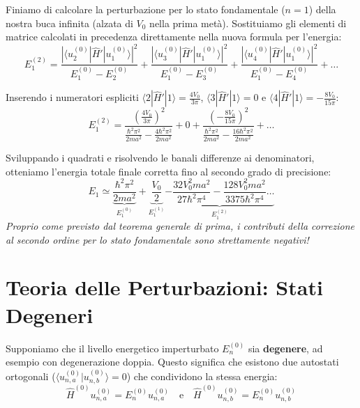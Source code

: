 \documentclass[11pt, a4paper]{article}
\begin{document}
Finiamo di calcolare la perturbazione per lo stato fondamentale ($n=1$) della nostra buca infinita (alzata di $V_0$ nella prima metà). Sostituiamo gli elementi di matrice calcolati in precedenza direttamente nella nuova formula per l'energia: %
\begin{equation*}
    E_1^{(2)} = \frac{|\langle u_2^{(0)} | \hat{H}' | u_1^{(0)} \rangle|^2}{E_1^{(0)} - E_2^{(0)}} + \frac{|\langle u_3^{(0)} | \hat{H}' | u_1^{(0)} \rangle|^2}{E_1^{(0)} - E_3^{(0)}} + \frac{|\langle u_4^{(0)} | \hat{H}' | u_1^{(0)} \rangle|^2}{E_1^{(0)} - E_4^{(0)}} + \dots %
\end{equation*}

\noindent
Inserendo i numeratori espliciti $\langle 2|\hat{H}'|1 \rangle = \frac{4V_0}{3\pi}$, $\langle 3|\hat{H}'|1 \rangle = 0$ e $\langle 4|\hat{H}'|1 \rangle = -\frac{8V_0}{15\pi}$: %
\begin{equation*}
    E_1^{(2)} = \frac{ \left( \frac{4V_0}{3\pi} \right)^2 }{ \frac{\hbar^2\pi^2}{2ma^2} - \frac{4\hbar^2\pi^2}{2ma^2} } + 0 + \frac{ \left( -\frac{8V_0}{15\pi} \right)^2 }{ \frac{\hbar^2\pi^2}{2ma^2} - \frac{16\hbar^2\pi^2}{2ma^2} } + \dots %
\end{equation*}

\noindent
Sviluppando i quadrati e risolvendo le banali differenze ai denominatori, otteniamo l'energia totale finale corretta fino al secondo grado di precisione: %
\begin{equation}
    \boxed{ E_1 \simeq \underbrace{ \frac{\hbar^2 \pi^2}{2ma^2} }_{E_1^{(0)}} + \underbrace{ \frac{V_0}{2} }_{E_1^{(1)}} \underbrace{ - \frac{32 V_0^2 m a^2}{27 \hbar^2 \pi^4} - \frac{128 V_0^2 m a^2}{3375 \hbar^2 \pi^4} \dots }_{E_1^{(2)}} } %
\end{equation}
\textit{Proprio come previsto dal teorema generale di prima, i contributi della correzione al secondo ordine per lo stato fondamentale sono strettamente negativi!} %

\section{Teoria delle Perturbazioni: Stati Degeneri} %

Supponiamo che il livello energetico imperturbato $E_n^{(0)}$ sia \textbf{degenere}, ad esempio con degenerazione doppia. Questo significa che esistono due autostati ortogonali ($\langle u_{n,a}^{(0)} | u_{n,b}^{(0)} \rangle = 0$) che condividono la stessa energia:
\begin{equation*}
    \hat{H}^{(0)} u_{n,a}^{(0)} = E_n^{(0)} u_{n,a}^{(0)} \quad \text{e} \quad \hat{H}^{(0)} u_{n,b}^{(0)} = E_n^{(0)} u_{n,b}^{(0)} %
\end{equation*}
\end{document}
